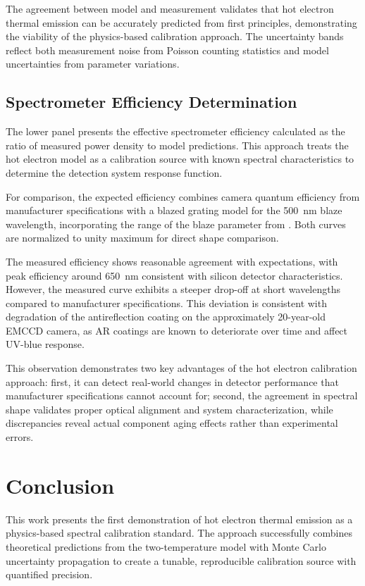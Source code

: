 \documentclass[
	parskip=half,
	a4paper,
]{scrarticle}
\begin{document}
The agreement between model and measurement validates that hot electron thermal emission can be accurately predicted from first principles, demonstrating the viability of the physics-based calibration approach. The uncertainty bands reflect both measurement noise from Poisson counting statistics and model uncertainties from parameter variations.

\subsection{Spectrometer Efficiency Determination}
The lower panel presents the effective spectrometer efficiency calculated as the ratio of measured power density to model predictions. This approach treats the hot electron model as a calibration source with known spectral characteristics to determine the detection system response function.

For comparison, the expected efficiency combines camera quantum efficiency from manufacturer specifications with a blazed grating model for the \SI{500}{\nm} blaze wavelength, incorporating the range of the blaze parameter from \cite{barker_ripple_1984}. Both curves are normalized to unity maximum for direct shape comparison.

The measured efficiency shows reasonable agreement with expectations, with peak efficiency around \SI{650}{\nm} consistent with silicon detector characteristics. However, the measured curve exhibits a steeper drop-off at short wavelengths compared to manufacturer specifications. This deviation is consistent with degradation of the antireflection coating on the approximately 20-year-old EMCCD camera, as AR coatings are known to deteriorate over time and affect UV-blue response.

This observation demonstrates two key advantages of the hot electron calibration approach: first, it can detect real-world changes in detector performance that manufacturer specifications cannot account for; second, the agreement in spectral shape validates proper optical alignment and system characterization, while discrepancies reveal actual component aging effects rather than experimental errors.



\section{Conclusion}

This work presents the first demonstration of hot electron thermal emission as a physics-based spectral calibration standard. The approach successfully combines theoretical predictions from the two-temperature model with Monte Carlo uncertainty propagation to create a tunable, reproducible calibration source with quantified precision.
\end{document}
